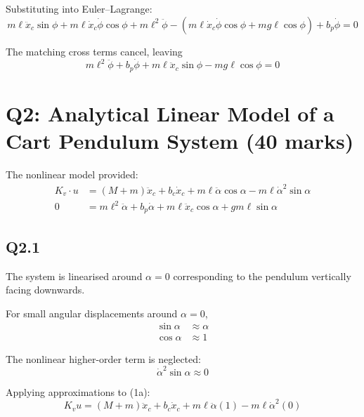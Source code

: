 \documentclass[11pt,a4paper]{article}
\begin{document}
Substituting into Euler--Lagrange:
\begin{equation*}
	m \ell \ddot{x}_{c} \sin\phi
	+ m \ell \dot{x}_{c} \dot{\phi} \cos\phi
	+ m \ell^{2} \ddot{\phi}
	- \left( m \ell \dot{x}_{c} \dot{\phi} \cos\phi + m g \ell \cos\phi \right)
	+ b_{p} \dot{\phi} = 0
\end{equation*}

The matching cross terms cancel, leaving
\begin{equation*}
	\boxed{\;
		m \ell^{2} \ddot{\phi} + b_{p} \dot{\phi}
		+ m \ell \ddot{x}_{c} \sin\phi - m g \ell \cos\phi = 0
		\;} \tag{1b}
\end{equation*}

\section*{Q2: Analytical Linear Model of a Cart Pendulum System
	\hfill (40 marks)}

The nonlinear model provided:
\begin{align}
	K_{v} \cdot u &= \left( M + m \right) \ddot{x}_{c} + b_{c} \dot{x}_{c}
	+ m \ell \ddot{\alpha} \cos\alpha
	- m \ell \dot{\alpha}^{2} \sin\alpha \tag{1a} \\
	0 &= m \ell^{2} \ddot{\alpha} + b_{p} \dot{\alpha}
	+ m \ell \ddot{x}_{c} \cos\alpha + g m \ell \sin\alpha \tag{1b}
\end{align}

\subsection*{Q2.1}

The system is linearised around $\alpha = 0$ corresponding to the pendulum
vertically facing downwards.

For small angular displacements around $\alpha = 0$,
\begin{align*}
	\sin\alpha &\approx \alpha \\
	\cos\alpha &\approx 1
\end{align*}

The nonlinear higher-order term is neglected:
\begin{equation*}
	\dot{\alpha}^{2} \sin\alpha \approx 0
\end{equation*}

Applying approximations to (1a):
\begin{equation*}
    K_{v} u = \left( M + m \right) \ddot{x}_{c} + b_{c}\dot{x}_{c} 
	+ m\ell\ddot{\alpha}(1) - m\ell\dot{\alpha}^{2}(0)
\end{equation*}
\end{document}
